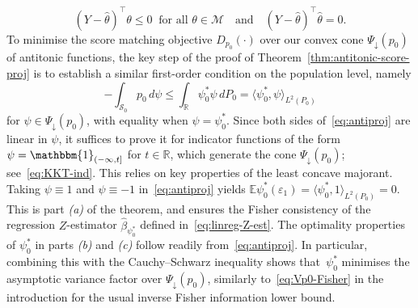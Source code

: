 \documentclass[a4paper]{article}
\newcommand{\R}{\mathbb{R}}
\newcommand{\E}{\mathbb{E}}
\newcommand{\Ind}{\mathbbm{1}}
\newcommand{\ipr}[2]{\langle #1, #2 \rangle}
\theoremstyle{definition}
\begin{document}
\begin{equation}
\label{eq:cvx-proj}
(Y - \widehat{\theta})^\top\theta \leq 0 \;\;\text{for all }\theta \in \mathcal{M} \quad\text{and}\quad
(Y - \widehat{\theta})^\top\widehat{\theta} = 0.
\end{equation}
To minimise the score matching objective $D_{p_0}(\cdot)$ over our convex cone $\Psi_\downarrow(p_0)$ of antitonic functions, the key step of the proof of Theorem~\ref{thm:antitonic-score-proj} is to establish a similar first-order condition on the population level, namely
\begin{equation}
\label{eq:antiproj}
-\int_{\mathcal{S}_0} p_0\,d\psi \leq \int_\R\psi_0^*\psi\,dP_0 = \ipr{\psi_0^*}{\psi}_{L^2(P_0)}
\end{equation}
for $\psi \in \Psi_\downarrow(p_0)$, with equality when $\psi = \psi_0^*$. Since both sides of~\eqref{eq:antiproj} are linear in $\psi$, 
it suffices to prove it for indicator functions of the form $\psi = \Ind_{(-\infty,t]}$ for $t \in \R$, which generate the cone $\Psi_\downarrow(p_0)$; see~\eqref{eq:KKT-ind}. This relies on key properties of the least concave majorant. Taking $\psi \equiv 1$ and $\psi \equiv -1$ in~\eqref{eq:antiproj} yields $\E\psi_0^*(\varepsilon_1) = \ipr{\psi_0^*}{1}_{L^2(P_0)} = 0$. This is part \textit{(a)} of the theorem, and
ensures the Fisher consistency of the regression $Z$-estimator $\hat{\beta}_{\psi_0^*}$ defined in~\eqref{eq:linreg-Z-est}.  
The optimality properties of $\psi_0^*$ in parts \textit{(b)} and \textit{(c)} follow readily from~\eqref{eq:antiproj}. In particular, combining this with the Cauchy--Schwarz inequality shows that~$\psi_0^*$ minimises the asymptotic variance factor over $\Psi_\downarrow(p_0)$, similarly to~\eqref{eq:Vp0-Fisher} in the introduction for the usual inverse Fisher information lower bound.
\end{document}
